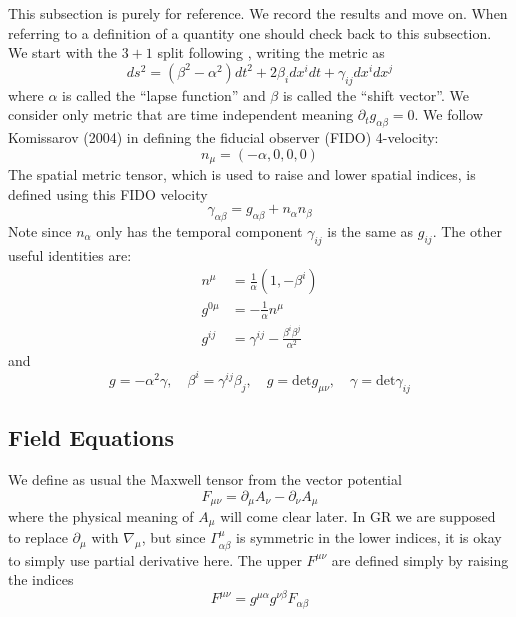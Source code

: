 This subsection is purely for reference. We record the results and move on. When
referring to a definition of a quantity one should check back to this subsection.
We start with the $3+1$ split following
\citet{macdonald_black-hole_1982}, writing the
metric as
\begin{equation}
  \label{eq:2}
  ds^2 = (\beta^2 - \alpha^2)dt^2 + 2\beta_idx^idt + \gamma_{ij}dx^idx^j
\end{equation}
where $\alpha$ is called the ``lapse function'' and $\beta$ is called the
``shift vector''. We consider only metric that are time independent meaning
$\partial_tg_{\alpha\beta} = 0$. We follow Komissarov (2004) in defining the
fiducial observer (FIDO) 4-velocity:
\begin{equation}
  \label{eq:4}
  n_{\mu} = (-\alpha, 0, 0, 0)
\end{equation}
The spatial metric tensor, which is used to raise and lower spatial indices, is
defined using this FIDO velocity
\begin{equation}
  \label{eq:1}
  \gamma_{\alpha\beta} = g_{\alpha\beta} + n_{\alpha}n_{\beta}
\end{equation}
Note since $n_{\alpha}$ only has the temporal component $\gamma_{ij}$ is the
same as $g_{ij}$. The other useful identities are:
\begin{align}
\label{eq:3}
n^{\mu} &= \frac{1}{\alpha}(1, -\beta^i) \\
g^{0\mu} &= -\frac{1}{\alpha}n^{\mu} \\
g^{ij} &= \gamma^{ij} - \frac{\beta^i\beta^j}{\alpha^2}
\end{align}
and
\begin{equation}
  \label{eq:5}
  g = -\alpha^{2}\gamma, \quad \beta^i = \gamma^{ij}\beta_{j}, \quad g = \mathrm{det} g_{\mu\nu}, \quad \gamma = \mathrm{det}\gamma_{ij}
\end{equation}

\subsection{Field Equations}
\label{sec:field}

We define as usual the Maxwell tensor from the vector potential
\begin{equation}
  \label{eq:6}
  F_{\mu\nu} = \partial_{\mu}A_{\nu} - \partial_{\nu}A_{\mu}
\end{equation}
where the physical meaning of $A_{\mu}$ will come clear later. In GR we are
supposed to replace $\partial_{\mu}$ with $\nabla_{\mu}$, but since
$\Gamma_{\alpha\beta}^{\mu}$ is symmetric in the lower indices, it is okay to
simply use partial derivative here. The upper $F^{\mu\nu}$ are defined simply by
raising the indices
\begin{equation}
  \label{eq:8}
  F^{\mu\nu} = g^{\mu\alpha}g^{\nu\beta}F_{\alpha\beta}
\end{equation}


